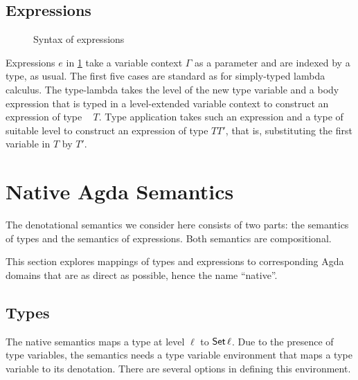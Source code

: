 \documentclass[manuscript,screen,review,anonymous]{acmart}
\begin{document}
\subsection{Expressions}
\label{sec:syntax-expressions}

\begin{figure}[tp]
  \SFExpr
  \caption{Syntax of expressions}
  \label{fig:native-expression-syntax}
\end{figure}
Expressions $e$ in \cref{fig:native-expression-syntax} take a variable context $\Gamma$ as a parameter and are indexed
by a type, as usual. The first five cases are standard as for
simply-typed lambda calculus. The type-lambda takes the level of the
new type variable and a body expression that is typed in a
level-extended variable context to construct an expression of type
\AgdaDatatype{$\forall\alpha$}~ $T$. Type application takes such an expression and a
type of suitable level to construct an expression of type $T$\AgdaDatatype{$[$}$T'$\AgdaDatatype{$]$T},
that is, substituting the first variable in $T$ by $T'$.

\section{Native Agda Semantics}
\label{sec:semantics}

The denotational semantics we consider here consists of two parts: the semantics of
types and the semantics of expressions. Both semantics are
compositional.

This section explores mappings of types and expressions to
corresponding Agda domains that are as direct as possible, hence the
name ``native''.

\subsection{Types}
\label{sec:types-1}


The native semantics maps a type at level
$\ell$ to $\ASeti\ell$. Due to the presence of type variables, the
semantics needs a type variable environment that maps a type variable
to its denotation. There are several options in defining this
environment.
\end{document}

